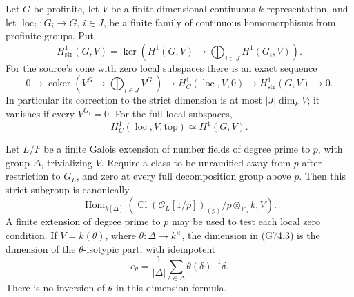 \begin{proposition}
\label{prop:ACG74cone}
Let \(G\) be profinite, let \(V\) be a finite-dimensional continuous
\(k\)-representation, and let
\(\operatorname{loc}_i:G_i\longrightarrow G\), \(i\in J\), be a finite
family of continuous homomorphisms from profinite groups.  Put
\[
 H^1_{\mathrm{str}}(G,V)=
 \ker\left(H^1(G,V)\longrightarrow
                  \bigoplus_{i\in J}H^1(G_i,V)\right).
\]
For the source's cone with zero local subspaces there is an exact sequence
\[
 0\longrightarrow
 \operatorname{coker}\left(V^G\longrightarrow
                   \bigoplus_{i\in J}V^{G_i}\right)
 \longrightarrow H^1_C(\operatorname{loc},V,0)
 \longrightarrow H^1_{\mathrm{str}}(G,V)
 \longrightarrow0.                                             \tag{G74.1}
\]
In particular its correction to the strict dimension is at most
\(|J|\dim_k V\); it vanishes if every \(V^{G_i}=0\).
For the full local subspaces,
\[
                    H^1_C(\operatorname{loc},V,\mathrm{top})
                         \simeq H^1(G,V).                       \tag{G74.2}
\]

Let \(L/F\) be a finite Galois extension of number fields of degree
prime to \(p\), with group \(\Delta\), trivializing \(V\).
Require a class to be unramified away from \(p\) after restriction to
\(G_L\), and zero at every full decomposition group above \(p\).
Then this strict subgroup is canonically
\[
 \operatorname{Hom}_{k[\Delta]}
 \left(\operatorname{Cl}(\mathcal O_L[1/p])_{(p)}/p
                          \otimes_{\mathbf F_p}k,V\right).
                                                               \tag{G74.3}
\]
A finite extension of degree prime to \(p\) may be used to test each
local zero condition.  If \(V=k(\theta)\), where
\(\theta:\Delta\longrightarrow k^\times\), the dimension in (G74.3)
is the dimension of the \(\theta\)-isotypic part, with idempotent
\[
             e_\theta=\frac1{|\Delta|}
                      \sum_{\delta\in\Delta}\theta(\delta)^{-1}\delta .
                                                               \tag{G74.4}
\]
There is no inversion of \(\theta\) in this dimension formula.
\end{proposition}


